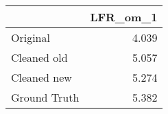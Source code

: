 \begin{tabular}{lr}
\toprule
{} & LFR_om_1 \\
\midrule
Original     &    4.039 \\
Cleaned old  &    5.057 \\
Cleaned new  &    5.274 \\
Ground Truth &    5.382 \\
\bottomrule
\end{tabular}
